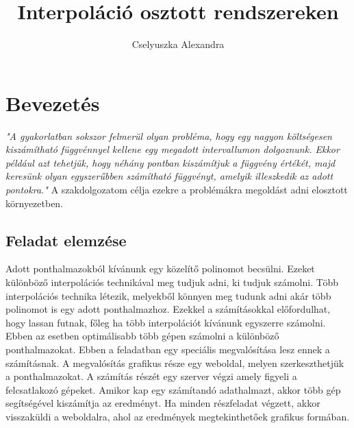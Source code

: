 \documentclass{elteikthesis}
\title{Interpoláció osztott rendszereken}
\author{Cselyuszka Alexandra}
\begin{document}
\frontmatter

	\maketitle

\mainmatter

\tableofcontents
	
\chapter{Bevezetés} 

	\textit{
	"A gyakorlatban sokszor felmerül olyan probléma, hogy egy nagyon költségesen kiszámítható függvénnyel kellene egy megadott intervallumon dolgoznunk. Ekkor például azt tehetjük, hogy néhány pontban kiszámítjuk a függvény értékét, majd keresünk olyan egyszerűbben számítható függvényt, amelyik illeszkedik az adott pontokra." }\cite{numanalbev}
	\newline
	\newline
	A szakdolgozatom célja ezekre a problémákra megoldást adni elosztott környezetben. 
	\section{Feladat elemzése}
	Adott ponthalmazokból kívánunk egy közelítő polinomot becsülni. Ezeket különböző interpolációs technikával meg tudjuk adni, ki tudjuk számolni. Több interpolációs technika létezik, melyekből könnyen meg tudunk adni akár több polinomot is egy adott ponthalmazhoz.\newline
	Ezekkel a számításokkal előfordulhat, hogy lassan futnak, főleg ha több interpolációt kívánunk egyszerre számolni.
	Ebben az esetben optimálisabb több gépen számolni a különböző ponthalmazokat.
	\newline\newline
	Ebben a feladatban egy speciális megvalósítása lesz ennek a számításnak. 
	\newline
	A megvalósítás grafikus része egy weboldal, melyen szerkeszthetjük a ponthalmazokat. A számítás részét egy szerver végzi amely figyeli a felcsatlakozó gépeket. Amikor kap egy számítandó adathalmazt, akkor több gép segítségével kiszámítja az eredményt. Ha minden részfeladat végzett, akkor visszaküldi a weboldalra, ahol az eredmények megtekinthetőek grafikus formában.
	\newline\newline
\end{document}
